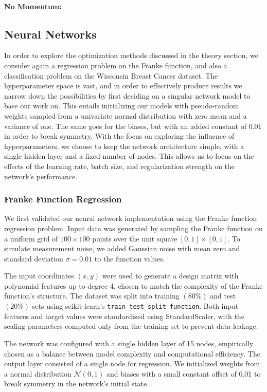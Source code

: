 \paragraph{No Momentum:}

\subsection{Neural Networks}
In order to explore the optimization methods discussed in the theory section, we consider again a regression problem on the Franke function, and also a classification problem on the Wisconsin Breast Cancer dataset. 
The hyperparameter space is vast, and in order to effectively produce results we narrow down the possibilities by first deciding on a singular network model to base our work on. This entails initializing our models with pseudo-random weights sampled from a univariate normal distribution with zero mean and a variance of one. The same goes for the biases, but with an added constant of 0.01 in order to break symmetry. With the focus on exploring the influence of hyperparameters, we choose to keep the network architecture simple, with a single hidden layer and a fixed number of nodes. This allows us to focus on the effects of the learning rate, batch size, and regularization strength on the network's performance.
\subsubsection{Franke Function Regression}

We first validated our neural network implementation using the Franke function regression problem. Input data was generated by sampling the Franke function on a uniform grid of \( 100 \times 100 \) points over the unit square \( [0,1]\times[0,1] \). To simulate measurement noise, we added Gaussian noise with mean zero and standard deviation \( \sigma = 0.01 \) to the function values.

The input coordinates \( (x,y) \) were used to generate a design matrix with polynomial features up to degree 4, chosen to match the complexity of the Franke function's structure. The dataset was split into training \( (80\%) \) and test \( (20\%) \) sets using scikit-learn's \verb|train_test_split function|. Both input features and target values were standardized using StandardScaler, with the scaling parameters computed only from the training set to prevent data leakage.

The network was configured with a single hidden layer of 15 nodes, empirically chosen as a balance between model complexity and computational efficiency. The output layer consisted of a single node for regression. We initialized weights from a normal distribution \( \mathcal{N} (0,1) \) and biases with a small constant offset of 0.01 to break symmetry in the network's initial state.

